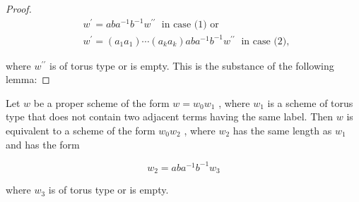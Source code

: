 \begin{proof}
\[
\begin{aligned}  & {w}^{\prime } = {ab}{a}^{-1}{b}^{-1}{w}^{\prime \prime }\;\text{ in case (1) or } \\  & {w}^{\prime } = \left( {{a}_{1}{a}_{1}}\right) \cdots \left( {{a}_{k}{a}_{k}}\right) {ab}{a}^{-1}{b}^{-1}{w}^{\prime \prime }\;\text{ in case (2), } \end{aligned}
\]

where \({w}^{\prime \prime }\) is of torus type or is empty. This is the substance of the following lemma:
\end{proof}
\begin{lemma} Let \(w\) be a proper scheme of the form \(w = {w}_{0}{w}_{1}\) , where \({w}_{1}\) is a scheme of torus type that does not contain two adjacent terms having the same label. Then \(w\) is equivalent to a scheme of the form \({w}_{0}{w}_{2}\) , where \({w}_{2}\) has the same length as \({w}_{1}\) and has the form

\[
{w}_{2} = {ab}{a}^{-1}{b}^{-1}{w}_{3}
\]

where \({w}_{3}\) is of torus type or is empty.
\end{lemma}

